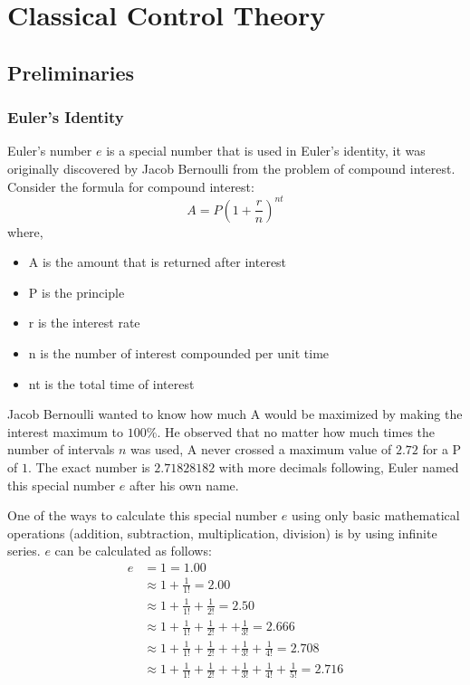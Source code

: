 \part{Classical Control Theory}

\chapter{Preliminaries}

\section{Euler's Identity} \label{Sec_Prelim_EulersIdentity}

Euler's number $e$ is a special number that is used in Euler's identity, it was originally discovered by Jacob Bernoulli from the problem of compound interest. Consider the formula for compound interest:
\begin{equation}
	A = P \left( 1 + \frac{r}{n} \right)^{nt}
\end{equation}
where,
\begin{itemize}
	\item A is the amount that is returned after interest
	\item P is the principle
	\item r is the interest rate
	\item n is the number of interest compounded per unit time
	\item nt is the total time of interest
\end{itemize}
Jacob Bernoulli wanted to know how much A would be maximized by making the interest maximum to $100\%$. He observed that no matter how much times the number of intervals $n$ was used, A never crossed a maximum value of $2.72$ for a P of $1$. The exact number is $2.71828182$ with more decimals following, Euler named this special number $e$ after his own name. 

One of the ways to calculate this special number $e$ using only basic mathematical operations (addition, subtraction, multiplication, division) is by using infinite series. $e$ can be calculated as follows:
\begin{align*}
	e	&= 1 = 1.00 \\
		&\approx 1 + \frac{1}{1!} = 2.00 \\
		&\approx 1 + \frac{1}{1!} + \frac{1}{2!} = 2.50 \\
		&\approx 1 + \frac{1}{1!} + \frac{1}{2!} + + \frac{1}{3!} = 2.666 \\
		&\approx 1 + \frac{1}{1!} + \frac{1}{2!} + + \frac{1}{3!} + \frac{1}{4!} = 2.708 \\
		&\approx 1 + \frac{1}{1!} + \frac{1}{2!} + + \frac{1}{3!} + \frac{1}{4!} + \frac{1}{5!} = 2.716
\end{align*}

